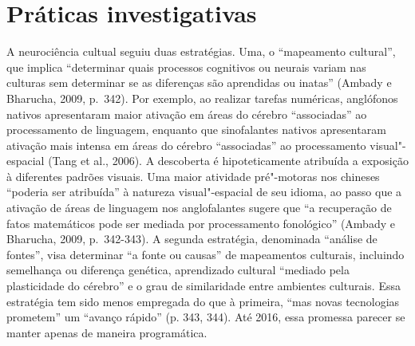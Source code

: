 \chapter{Práticas investigativas}

A neurociência cultual seguiu duas estratégias. Uma, o ``mapeamento
cultural'', que implica ``determinar quais processos cognitivos ou
neurais variam nas culturas sem determinar se as diferenças são
aprendidas ou inatas'' (Ambady e Bharucha, 2009, p.~342). Por exemplo, ao
realizar tarefas numéricas, anglófonos nativos apresentaram maior
ativação em áreas do cérebro ``associadas'' ao processamento de
linguagem, enquanto que sinofalantes nativos apresentaram ativação mais
intensa em áreas do cérebro ``associadas'' ao processamento
visual"-espacial (Tang et al., 2006). A descoberta é hipoteticamente
atribuída a exposição à diferentes padrões visuais. Uma maior atividade
pré"-motoras nos chineses ``poderia ser atribuída'' à natureza
visual"-espacial de seu idioma, ao passo que a ativação de áreas de
linguagem nos anglofalantes sugere que ``a recuperação de fatos
matemáticos pode ser mediada por processamento fonológico'' (Ambady e
Bharucha, 2009, p.~342-343). A segunda estratégia, denominada ``análise
de fontes'', visa determinar ``a fonte ou causas'' de mapeamentos
culturais, incluindo semelhança ou diferença genética, aprendizado
cultural ``mediado pela plasticidade do cérebro'' e o grau de
similaridade entre ambientes culturais. Essa estratégia tem sido menos
empregada do que à primeira, ``mas novas tecnologias prometem'' um
``avanço rápido'' (p. 343, 344). Até 2016, essa promessa parecer se
manter apenas de maneira programática.

